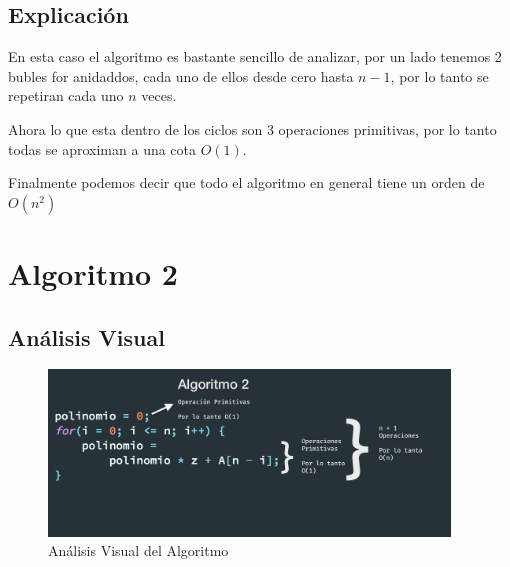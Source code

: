 \documentclass[12pt, fleqn]{article}                            %
\theoremstyle{break}                                            %
\begin{document}
    \subsection{Explicación}


        En esta caso el algoritmo es bastante sencillo de analizar, por un lado tenemos
        2 bubles for anidaddos, cada uno de ellos desde cero hasta $n - 1$, por lo tanto se repetiran cada
        uno $n$ veces.

        Ahora lo que esta dentro de los ciclos son 3 operaciones primitivas, por lo tanto todas se aproximan
        a una cota $O(1)$.

        Finalmente podemos decir que todo el algoritmo en general tiene un orden de $O(n^2)$




\clearpage
\section{Algoritmo 2}


    \subsection{Análisis Visual}

        \begin{figure}[h]
            \centering
            \includegraphics[width=0.95\textwidth]{Algoritmo2}
            \caption{Análisis Visual del Algoritmo}
        \end{figure}

    \vspace{1em}
\end{document}
